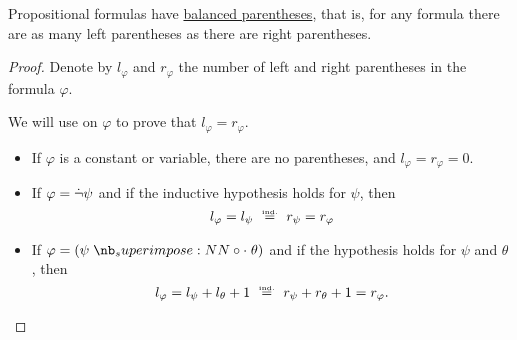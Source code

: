 \begin{proposition}\label{thm:propositional_formula_balanced_parentheses}
  Propositional formulas have \hyperref[ex:thm:regular_pumping_lemma/balanced_parentheses]{balanced parentheses}, that is, for any formula there are as many left parentheses as there are right parentheses.
\end{proposition}
\begin{proof}
  Denote by \( l_\varphi \) and \( r_\varphi \) the number of left and right parentheses in the formula \( \varphi \).

  We will use  on \( \varphi \) to prove that \( l_\varphi = r_\varphi \).
  \begin{itemize}
    \item If \( \varphi \) is a constant or variable, there are no parentheses, and \( l_\varphi = r_\varphi = 0 \).
    \item If \( \varphi = \dot\neg \psi \) and if the inductive hypothesis holds for \( \psi \), then
    \begin{equation*}
      l_\varphi = l_\psi \reloset{\T{ind.}} = r_\psi = r_\varphi
    \end{equation*}

    \item If \( \varphi = (\psi \syncirc \theta) \) and if the hypothesis holds for \( \psi \) and \( \theta \), then
    \begin{equation*}
      l_\varphi = l_\psi + l_\theta + 1 \reloset{\T{ind.}} = r_\psi + r_\theta + 1 = r_\varphi.
    \end{equation*}
  \end{itemize}
\end{proof}

